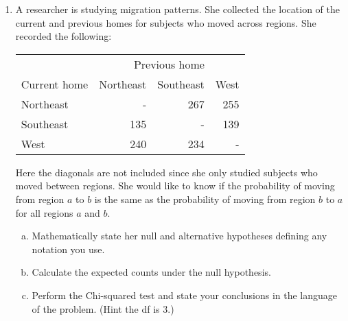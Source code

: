 \documentclass[12pt]{article}
\begin{document}
\begin{enumerate}[Problem 1.]
\item A researcher is studying migration patterns. She collected
  the location of the current and previous homes for subjects who
  moved across regions. She recorded the following:
  \begin{center}
    \begin{tabular}{lrrr}
              & \multicolumn{3}{c}{Previous home} \\ \cline{2-4}
Current home & Northeast & Southeast & West \\ \hline
Northeast & -    & 267 & 255     \\
Southeast & 135  &  -  & 139     \\
West      & 240  & 234 &   -     \\ \hline
    \end{tabular}
  \end{center}
 Here the diagonals are not included since she only studied
 subjects who moved between regions. She would like
 to know if the probability of moving from region $a$ to $b$
 is the same as the probability of moving from region $b$ to $a$ for
 all regions $a$ and $b$.
 \begin{enumerate}[a.]
 \item Mathematically state her null and alternative hypotheses defining any notation you use.
 \item Calculate the expected counts under the null hypothesis.
 \item Perform the Chi-squared test and state your conclusions in the language of the problem. (Hint the df is $3$.)
 \end{enumerate}

\end{enumerate}
\end{document}

